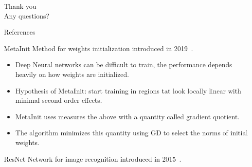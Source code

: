 \documentclass[10pt]{beamer}
\begin{document}
\begin{frame}{ }
\begin{center}
    \Huge Thank you\\ Any questions?
\end{center}
   
\end{frame}


\begin{frame}[allowframebreaks]{References}
		\renewcommand*{\bibfont}{\tiny}
		
\end{frame}

\begin{frame}{MetaInit}
    Method for weights initialization introduced in 2019~\citep{dauphin2019metainit}.
    \begin{itemize}
        \item Deep Neural networks can be difficult to train, the performance depends heavily on how weights are initialized.
        \item Hypothesis of MetaInit: start training in regions tat look locally linear with minimal second order effects.
        \item MetaInit uses measures the above with a quantity called gradient quotient.
        \item The algorithm minimizes this quantity using GD to select the norms of initial weights.
    \end{itemize}
\end{frame}

\begin{frame}{ResNet}
    Network for image recognition introduced in 2015~\citep{he2015residual}.
    
    
\end{frame}
\end{document}
